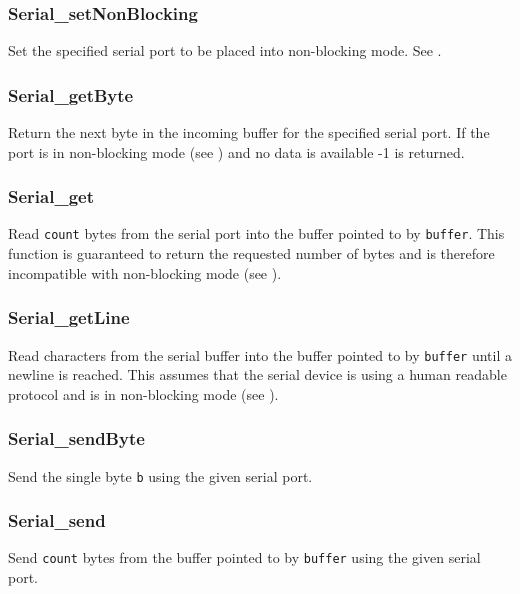 \subsubsection{Serial\_setNonBlocking} \label{apiserialnonblocking}
 Set the specified serial port
to be placed into non-blocking mode. See
.

\subsubsection{Serial\_getByte} \label{apiserialgetbyte}
 Return the next byte in the incoming
buffer for the specified serial port. If the port is in non-blocking mode (see
) and no data is
available -1 is returned. 

\subsubsection{Serial\_get} \label{apiserialget}
 Read
\texttt{count} bytes from the serial port into the buffer pointed to by
\texttt{buffer}. This function is guaranteed to return the requested number of
bytes and is therefore incompatible with non-blocking mode (see
).

\subsubsection{Serial\_getLine} \label{apiserialgetlin}
 Read characters from the
serial buffer into the buffer pointed to by \texttt{buffer} until a newline is
reached. This assumes that the serial device is using a human readable protocol
and is in non-blocking mode (see
).

\subsubsection{Serial\_sendByte} \label{apiserialsendbyte}
 Send the single byte
\texttt{b} using the given serial port.

\subsubsection{Serial\_send} \label{apiserialsend}
 Send
\texttt{count} bytes from the buffer pointed to by \texttt{buffer} using the
given serial port.


